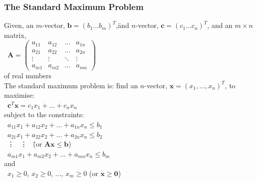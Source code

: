 \documentclass[10pt,letterpaper]{scrartcl}
\begin{document}
\subsubsection*{The Standard Maximum Problem}\begin{tabbing}
Given, an $m$-vector, $\mathbf{b}=(b_1\ldots b_m)^T$,\= and $n$-vector, $\mathbf{c}=(c_1\ldots c_n)^T$, and an $m\times n$ matrix, \\
\>\ $\displaystyle\mathbf{A} = \begin{pmatrix}
                                   a_{11} & a_{12} & \ldots & a_{1n} \\ 
                                   a_{21} & a_{22} & \ldots & a_{2n} \\
                                   \vdots & \vdots & \ddots & \vdots \\
                                   a_{m1} & a_{m2} & \ldots & a_{mn} 
                              \end{pmatrix}$ \\
of real numbers \\ 
The standard maximum problem is: \= find an $n$-vector, $\mathbf{x}=(x_1,\ldots , x_n)^T$, to maximise: \\
\>\ $\mathbf{c}^T\mathbf{x}=c_1x_1+\ldots +c_nx_n$ \\
subject to the constraints: \\ 
\>\ $a_{11}x_1 + a_{12}x_2 + \ldots + a_{1n}x_n \leq b_1$ \\
\>\ $a_{21}x_1 + a_{22}x_2 + \ldots + a_{2n}x_n \leq b_2$ \\
\>\ \vdots\ \hspace{12em} \vdots\ \hspace{2em} \=(or $\mathbf{Ax}\leq \mathbf{b}$) \\
\>\ $a_{m1}x_1 + a_{m2}x_2 + \ldots + a_{mn}x_n \leq b_m$ \\

and \\
\>\ $x_1 \geq 0$, $x_2 \geq 0$, $\ldots$, $x_m \geq 0$ \> (or $\mathbf{x} \geq \mathbf{0}$)\end{tabbing}
\end{document}
